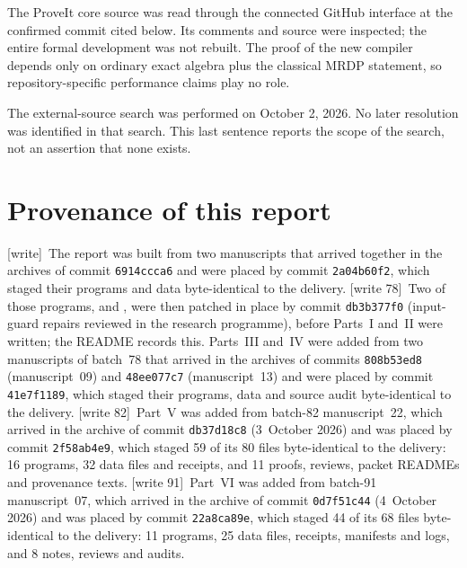 \documentclass[11pt,letterpaper]{article}
\theoremstyle{definition}
\theoremstyle{remark}
\newcommand{\wtag}{\textup{[write]}}
\newcommand{\wtagb}{\textup{[write 78]}}
\newcommand{\wtagc}{\textup{[write 82]}}
\newcommand{\wtagd}{\textup{[write 91]}}
\begin{document}
The ProveIt core source was read through the connected GitHub interface at
the confirmed commit cited below. Its comments and source were inspected;
the entire formal development was not rebuilt. The proof of the new
compiler depends only on ordinary exact algebra plus the classical MRDP
statement, so repository-specific performance claims play no role.

The external-source search was performed on October 2, 2026. No later
resolution was identified in that search. This last sentence reports the
scope of the search, not an assertion that none exists.

\section{Provenance of this report}\label{gts:app:provenance}

\wtag\ The report was built from two manuscripts that arrived together in the archives of commit \texttt{6914ccca6} and were placed by commit \texttt{2a04b60f2}, which staged their programs and data byte-identical to the delivery. \wtagb\ Two of those programs,  and , were then patched in place by commit \texttt{db3b377f0} (input-guard repairs reviewed in the research programme), before Parts~I and~II were written; the README records this. Parts~III and~IV were added from two manuscripts of batch~78 that arrived in the archives of commits \texttt{808b53ed8} (manuscript~09) and \texttt{48ee077c7} (manuscript~13) and were placed by commit \texttt{41e7f1189}, which staged their programs, data and source audit byte-identical to the delivery. \wtagc\ Part~V was added from batch-82 manuscript~22, which arrived in the archive of commit \texttt{db37d18c8} (3~October 2026) and was placed by commit \texttt{2f58ab4e9}, which staged 59 of its 80 files byte-identical to the delivery: 16 programs, 32 data files and receipts, and 11 proofs, reviews, packet READMEs and provenance texts. \wtagd\ Part~VI was added from batch-91 manuscript~07, which arrived in the archive of commit \texttt{0d7f51c44} (4~October 2026) and was placed by commit \texttt{22a8ca89e}, which staged 44 of its 68 files byte-identical to the delivery: 11 programs, 25 data files, receipts, manifests and logs, and 8 notes, reviews and audits.
\end{document}
